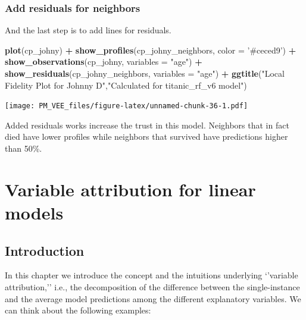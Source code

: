 \documentclass[12pt,]{krantz}
\newenvironment{Shaded}{\begin{snugshade}}{\end{snugshade}}
\newcommand{\DataTypeTok}[1]{\textcolor[rgb]{0.13,0.29,0.53}{#1}}
\newcommand{\KeywordTok}[1]{\textcolor[rgb]{0.13,0.29,0.53}{\textbf{#1}}}
\newcommand{\NormalTok}[1]{#1}
\newcommand{\OperatorTok}[1]{\textcolor[rgb]{0.81,0.36,0.00}{\textbf{#1}}}
\newcommand{\StringTok}[1]{\textcolor[rgb]{0.31,0.60,0.02}{#1}}
\theoremstyle{definition}
\theoremstyle{definition}
\theoremstyle{definition}
\theoremstyle{remark}
\begin{document}
\hypertarget{add-residuals-for-neighbors}{%
\subsubsection{Add residuals for
neighbors}\label{add-residuals-for-neighbors}}

And the last step is to add lines for residuals.

\begin{Shaded}
\begin{Highlighting}[]
\KeywordTok{plot}\NormalTok{(cp_johny) }\OperatorTok{+}
\StringTok{  }\KeywordTok{show_profiles}\NormalTok{(cp_johny_neighbors, }\DataTypeTok{color =} \StringTok{'#ceced9'}\NormalTok{) }\OperatorTok{+}\StringTok{ }
\StringTok{  }\KeywordTok{show_observations}\NormalTok{(cp_johny, }\DataTypeTok{variables =} \StringTok{"age"}\NormalTok{) }\OperatorTok{+}
\StringTok{  }\KeywordTok{show_residuals}\NormalTok{(cp_johny_neighbors, }\DataTypeTok{variables =} \StringTok{"age"}\NormalTok{) }\OperatorTok{+}
\StringTok{  }\KeywordTok{ggtitle}\NormalTok{(}\StringTok{"Local Fidelity Plot for Johnny D"}\NormalTok{,}\StringTok{"Calculated for titanic_rf_v6 model"}\NormalTok{)}
\end{Highlighting}
\end{Shaded}

\texttt{[image: PM\_VEE\_files/figure-latex/unnamed-chunk-36-1.pdf]}

Added residuals works increase the trust in this model. Neighbors that
in fact died have lower profiles while neighbors that survived have
predictions higher than 50\%.

\hypertarget{variableAttributionMethods}{%
\section{Variable attribution for linear
models}\label{variableAttributionMethods}}

\hypertarget{introduction-5}{%
\subsection{Introduction}\label{introduction-5}}

In this chapter we introduce the concept and the intuitions underlying
`'variable attribution,'' i.e., the decomposition of the difference
between the single-instance and the average model predictions among the
different explanatory variables. We can think about the following
examples:
\end{document}
